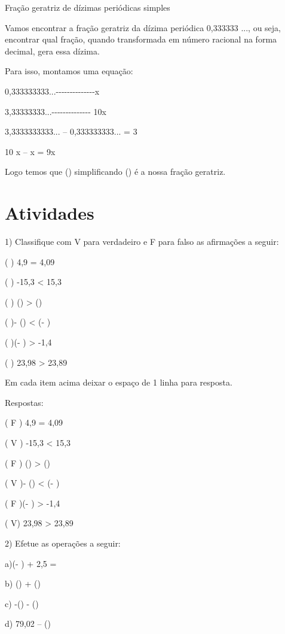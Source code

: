 Fração geratriz de dízimas periódicas simples

Vamos encontrar a fração geratriz da dízima periódica 0,333333 ..., ou
seja, encontrar qual fração, quando transformada em número racional na
forma decimal, gera essa dízima.

Para isso, montamos uma equação:

0,333333333...-\/-\/-\/-\/-\/-\/-\/-\/-\/-\/-\/-\/-\/-x

3,33333333...-\/-\/-\/-\/-\/-\/-\/-\/-\/-\/-\/-\/-\/- 10x

3,3333333333... -- 0,333333333... = 3

10 x -- x = 9x

Logo temos que () simplificando () é a nossa
fração geratriz.

\section{Atividades}

1) Classifique com V para verdadeiro e F para falso as afirmações a
seguir:

( ) 4,9 = 4,09

( ) -15,3 \textless{} 15,3

( ) () \textgreater{} ()

( )- () \textless{} (- )

( )(- ) \textgreater{} -1,4

( ) 23,98 \textgreater{} 23,89

Em cada item acima deixar o espaço de 1 linha para resposta.

Respostas:

( F ) 4,9 = 4,09

( V ) -15,3 \textless{} 15,3

( F ) () \textgreater{} ()

( V )- () \textless{} (- )

( F )(- ) \textgreater{} -1,4

( V) 23,98 \textgreater{} 23,89

2) Efetue as operações a seguir:

a)(- ) + 2,5 =

b) () + ()

c) -() - ()

d) 79,02 -- ()

